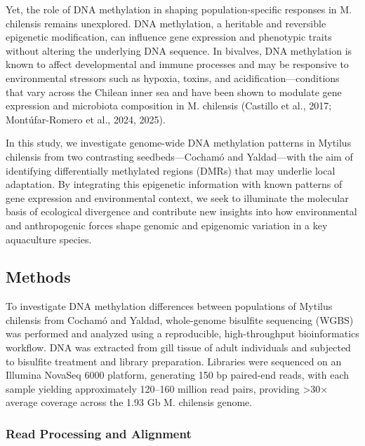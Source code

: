 \documentclass[
]{agujournal2019}
\begin{document}
Yet, the role of DNA methylation in shaping population-specific
responses in M. chilensis remains unexplored. DNA methylation, a
heritable and reversible epigenetic modification, can influence gene
expression and phenotypic traits without altering the underlying DNA
sequence. In bivalves, DNA methylation is known to affect developmental
and immune processes and may be responsive to environmental stressors
such as hypoxia, toxins, and acidification---conditions that vary across
the Chilean inner sea and have been shown to modulate gene expression
and microbiota composition in M. chilensis (Castillo et al., 2017;
Montúfar-Romero et al., 2024, 2025).

In this study, we investigate genome-wide DNA methylation patterns in
Mytilus chilensis from two contrasting seedbeds---Cochamó and
Yaldad---with the aim of identifying differentially methylated regions
(DMRs) that may underlie local adaptation. By integrating this
epigenetic information with known patterns of gene expression and
environmental context, we seek to illuminate the molecular basis of
ecological divergence and contribute new insights into how environmental
and anthropogenic forces shape genomic and epigenomic variation in a key
aquaculture species.

\subsection{Methods}\label{methods}

To investigate DNA methylation differences between populations of
Mytilus chilensis from Cochamó and Yaldad, whole-genome bisulfite
sequencing (WGBS) was performed and analyzed using a reproducible,
high-throughput bioinformatics workflow. DNA was extracted from gill
tissue of adult individuals and subjected to bisulfite treatment and
library preparation. Libraries were sequenced on an Illumina NovaSeq
6000 platform, generating 150 bp paired-end reads, with each sample
yielding approximately 120--160 million read pairs, providing
\textgreater30× average coverage across the 1.93 Gb M. chilensis genome.

\subsubsection{Read Processing and
Alignment}\label{read-processing-and-alignment}
\end{document}
